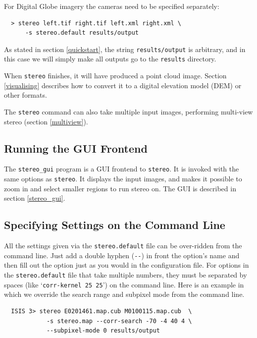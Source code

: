 For Digital Globe imagery the cameras need to be specified separately:


\begin{verbatim}
  > stereo left.tif right.tif left.xml right.xml \
      -s stereo.default results/output
\end{verbatim}

As stated in section \ref{quickstart}, the string
\texttt{results/output} is arbitrary, and in this case we will
simply make all outputs go to the \texttt{results} directory.

When \texttt{stereo} finishes, it will have produced a point cloud
image. Section \ref{visualising} describes how to convert it to a
digital elevation model (DEM) or other formats.

The \texttt{stereo} command can also take multiple input images, performing
multi-view stereo (section \ref{multiview}).

\subsection{Running the GUI Frontend}
The \texttt{stereo\_gui} program is a GUI frontend to \texttt{stereo}.
It is invoked with the same options as \texttt{stereo}. It displays
the input images, and makes it possible to zoom in and select smaller
regions to run stereo on. The GUI is described in section \ref{stereo_gui}.

\subsection{Specifying Settings on the Command Line}
\label{cmdline}

All the settings given via the \texttt{stereo.default} file can be
over-ridden from the command line. Just add a double hyphen
(\texttt{-\/-}) in front the option's name and then fill out the option
just as you would in the configuration file. For options in the
\texttt{stereo.default} file that take multiple numbers, they must be
separated by spaces (like `\texttt{corr-kernel~25~25}') on the command
line. Here is an example in which we override the search range and
subpixel mode from the command line.

\begin{verbatim}
  ISIS 3> stereo E0201461.map.cub M0100115.map.cub  \
            -s stereo.map --corr-search -70 -4 40 4 \
            --subpixel-mode 0 results/output
\end{verbatim}

